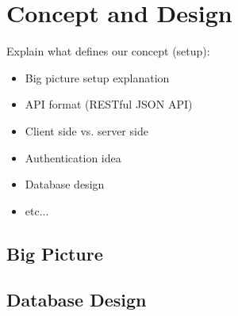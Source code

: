 \chapter{Concept and Design}
\label{cha:conceptanddesign}

Explain what defines our concept (setup):
\begin{itemize}
    \item Big picture setup explanation
    \item API format (RESTful JSON API)
    \item Client side vs. server side
    \item Authentication idea
    \item Database design
    \item etc...
\end{itemize}

\hline

\vspace{0.5cm}

\section{Big Picture}

\vspace{0.5cm}

\section{Database Design}